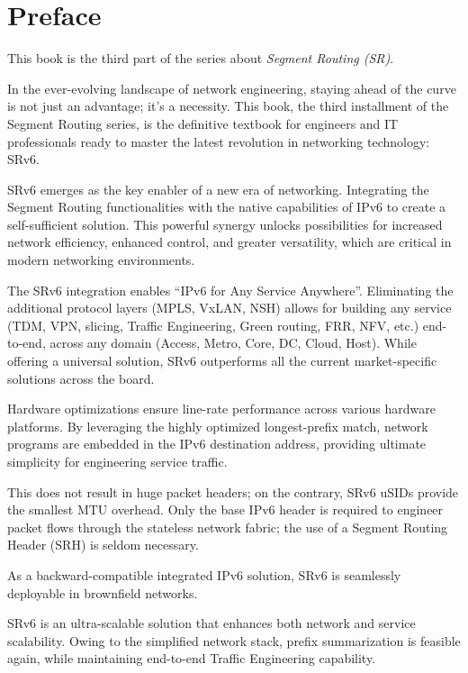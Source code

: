 \hypertarget{chap:preface}{%
\chapter{Preface}\label{chap:preface}}

This book is the third part of the series about \emph{Segment Routing (SR)}.

In the ever-evolving landscape of network engineering, staying ahead of the curve is not just an advantage; it's a necessity. This book, the third installment of the Segment Routing series, is the definitive textbook for engineers and IT professionals ready to master the latest revolution in networking technology: SRv6.

SRv6 emerges as the key enabler of a new era of networking. Integrating the Segment Routing functionalities with the native capabilities of IPv6 to create a self-sufficient solution. This powerful synergy unlocks possibilities for increased network efficiency, enhanced control, and greater versatility, which are critical in modern networking environments.

The SRv6 integration enables ``IPv6 for Any Service Anywhere''. Eliminating the additional protocol layers (MPLS, VxLAN, NSH) allows for building any service (TDM, VPN, slicing, Traffic Engineering, Green routing, FRR, NFV, etc.) end-to-end, across any domain (Access, Metro, Core, DC, Cloud, Host). While offering a universal solution, SRv6 outperforms all the current market-specific solutions across the board.

Hardware optimizations ensure line-rate performance across various hardware platforms. By leveraging the highly optimized longest-prefix match, network programs are embedded in the IPv6 destination address, providing ultimate simplicity for engineering service traffic.

This does not result in huge packet headers; on the contrary, SRv6 uSIDs provide the smallest MTU overhead. Only the base IPv6 header is required to engineer packet flows through the stateless network fabric; the use of a Segment Routing Header (SRH) is seldom necessary.

As a backward-compatible integrated IPv6 solution, SRv6 is seamlessly deployable in brownfield networks.

SRv6 is an ultra-scalable solution that enhances both network and service scalability. Owing to the simplified network stack, prefix summarization is feasible again, while maintaining end-to-end Traffic Engineering capability.

